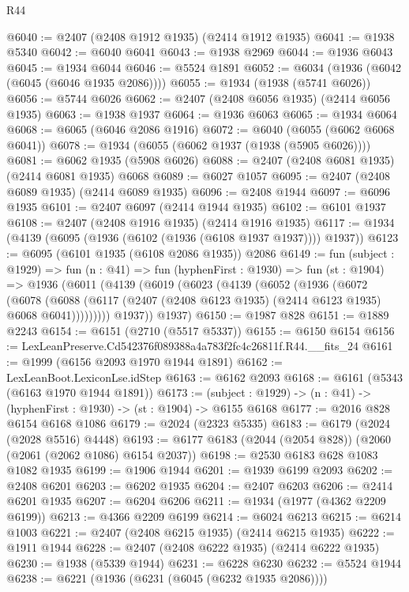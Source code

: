 \begin{lexlean}{R44}
\begin{coremodule}
@6040 := @2407 (@2408 @1912 @1935) (@2414 @1912 @1935)
@6041 := @1938 @5340
@6042 := @6040 @6041
@6043 := @1938 @2969
@6044 := @1936 @6043
@6045 := @1934 @6044
@6046 := @5524 @1891
@6052 := @6034 (@1936 (@6042 (@6045 (@6046 @1935 @2086))))
@6055 := @1934 (@1938 (@5741 @6026))
@6056 := @5744 @6026
@6062 := @2407 (@2408 @6056 @1935) (@2414 @6056 @1935)
@6063 := @1938 @1937
@6064 := @1936 @6063
@6065 := @1934 @6064
@6068 := @6065 (@6046 @2086 @1916)
@6072 := @6040 (@6055 (@6062 @6068 @6041))
@6078 := @1934 (@6055 (@6062 @1937 (@1938 (@5905 @6026))))
@6081 := @6062 @1935 (@5908 @6026)
@6088 := @2407 (@2408 @6081 @1935) (@2414 @6081 @1935) @6068
@6089 := @6027 @1057
@6095 := @2407 (@2408 @6089 @1935) (@2414 @6089 @1935)
@6096 := @2408 @1944
@6097 := @6096 @1935
@6101 := @2407 @6097 (@2414 @1944 @1935)
@6102 := @6101 @1937
@6108 := @2407 (@2408 @1916 @1935) (@2414 @1916 @1935)
@6117 := @1934 (@4139 (@6095 (@1936 (@6102 (@1936 (@6108 @1937 @1937)))) @1937))
@6123 := @6095 (@6101 @1935 (@6108 @2086 @1935)) @2086
@6149 := fun (subject : @1929) =>
  fun (n : @41) =>
  fun (hyphenFirst : @1930) =>
  fun (st : @1904) =>
  @1936
    (@6011
      (@4139
        (@6019
          (@6023
            (@4139
              (@6052
                (@1936
                  (@6072
                    (@6078
                      (@6088
                        (@6117 (@2407 (@2408 @6123 @1935) (@2414 @6123 @1935) @6068 @6041)))))))))
          @1937))
      @1937)
@6150 := @1987 @828
@6151 := @1889 @2243
@6154 := @6151 (@2710 (@5517 @5337))
@6155 := @6150 @6154
@6156 := LexLeanPreserve.Cd542376f089388a4a783f2fc4c26811f.R44.__fits_24
@6161 := @1999 (@6156 @2093 @1970 @1944 @1891)
@6162 := LexLeanBoot.LexiconLse.idStep
@6163 := @6162 @2093
@6168 := @6161 (@5343 (@6163 @1970 @1944 @1891))
@6173 := (subject : @1929) -> (n : @41) -> (hyphenFirst : @1930) -> (st : @1904) -> @6155 @6168
@6177 := @2016 @828 @6154 @6168 @1086
@6179 := @2024 (@2323 @5335)
@6183 := @6179 (@2024 (@2028 @5516) @4448)
@6193 := @6177 @6183 (@2044 (@2054 @828)) (@2060 (@2061 (@2062 @1086) @6154 @2037))
@6198 := @2530 @6183 @628 @1083 @1082 @1935
@6199 := @1906 @1944
@6201 := @1939 @6199 @2093
@6202 := @2408 @6201
@6203 := @6202 @1935
@6204 := @2407 @6203
@6206 := @2414 @6201 @1935
@6207 := @6204 @6206
@6211 := @1934 (@1977 (@4362 @2209 @6199))
@6213 := @4366 @2209 @6199
@6214 := @6024 @6213
@6215 := @6214 @1003
@6221 := @2407 (@2408 @6215 @1935) (@2414 @6215 @1935)
@6222 := @1911 @1944
@6228 := @2407 (@2408 @6222 @1935) (@2414 @6222 @1935)
@6230 := @1938 (@5339 @1944)
@6231 := @6228 @6230
@6232 := @5524 @1944
@6238 := @6221 (@1936 (@6231 (@6045 (@6232 @1935 @2086))))

\end{coremodule}
\end{lexlean}
